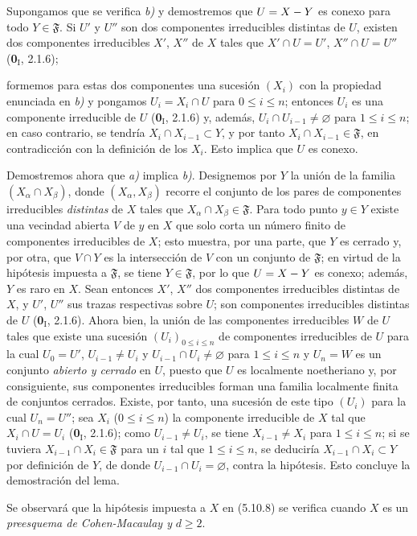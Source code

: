 Supongamos que se verifica \emph{b)} y demostremos que $U=X- Y$ es conexo para todo
$Y\in\mathfrak F$. Si $U'$ y $U''$ son dos componentes irreducibles distintas
de $U$, existen dos componentes irreducibles $X'$, $X''$ de $X$ tales que
$X'\cap U=U'$, $X''\cap U=U''$ (\textbf 0$_\mathrm I$, 2.1.6);


formemos para estas dos componentes una sucesión $(X_i)$ con la propiedad
enunciada en \emph{b)} y pongamos $U_i=X_i\cap U$ para $0\leq i\leq n$; entonces
$U_i$ es una componente irreducible de $U$ (\textbf 0$_\mathrm I$, 2.1.6) y, además,
$U_i\cap U_{i-1}\neq\varnothing$ para $1\leq i\leq n$; en caso contrario, se
tendría $X_i\cap X_{i-1}\subset Y$, y por tanto
$X_i\cap X_{i-1}\in\mathfrak F$, en contradicción con la definición de los
$X_i$. Esto implica que $U$ es conexo.

Demostremos ahora que \emph{a)} implica \emph{b)}. Designemos por $Y$ la unión de la familia
$(X_\alpha\cap X_\beta)$, donde $(X_\alpha,X_\beta)$ recorre el conjunto de
los pares de componentes irreducibles \emph{distintas} de $X$ tales que
$X_\alpha\cap X_\beta\in\mathfrak F$. Para todo punto $y\in Y$ existe una
vecindad abierta $V$ de $y$ en $X$ que solo corta un número finito de
componentes irreducibles de $X$; esto muestra, por una parte, que $Y$ es
cerrado y, por otra, que $V\cap Y$ es la intersección de $V$ con un conjunto
de $\mathfrak F$; en virtud de la hipótesis impuesta a $\mathfrak F$, se tiene
$Y\in\mathfrak F$, por lo que $U=X- Y$ es conexo; además, $Y$ es raro en $X$.
Sean entonces $X'$, $X''$ dos componentes irreducibles distintas de $X$, y
$U'$, $U''$ sus trazas respectivas sobre $U$; son componentes irreducibles
distintas de $U$ (\textbf 0$_\mathrm I$, 2.1.6). Ahora bien, la unión de las
componentes irreducibles $W$ de $U$ tales que existe una sucesión
$(U_i)_{0\leq i\leq n}$ de componentes irreducibles de $U$ para la cual
$U_0=U'$, $U_{i-1}\neq U_i$ y $U_{i-1}\cap U_i\neq\varnothing$ para
$1\leq i\leq n$ y $U_n=W$ es un conjunto \emph{abierto y cerrado} en $U$, puesto que
$U$ es localmente noetheriano y, por consiguiente, sus componentes
irreducibles forman una familia localmente finita de conjuntos cerrados.
Existe, por tanto, una sucesión de este tipo $(U_i)$ para la cual $U_n=U''$;
sea $X_i$ ($0\leq i\leq n$) la componente irreducible de $X$ tal que
$X_i\cap U=U_i$ (\textbf 0$_\mathrm I$, 2.1.6); como $U_{i-1}\neq U_i$, se tiene
$X_{i-1}\neq X_i$ para $1\leq i\leq n$; si se tuviera
$X_{i-1}\cap X_i\in\mathfrak F$ para un $i$ tal que $1\leq i\leq n$, se
deduciría $X_{i-1}\cap X_i\subset Y$ por definición de $Y$, de donde
$U_{i-1}\cap U_i=\varnothing$, contra la hipótesis. Esto concluye la
demostración del lema.

Se observará que la hipótesis impuesta a $X$ en (5.10.8) se verifica cuando
$X$ es un \emph{preesquema de Cohen-Macaulay y} $d\geq2$.

